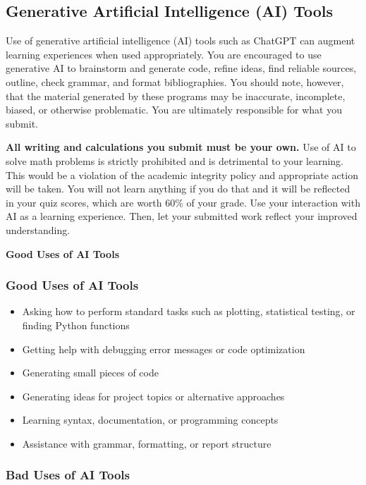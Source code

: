 \documentclass{article}
\begin{document}
\subsection{Generative Artificial Intelligence (AI) Tools}

Use of generative artificial intelligence (AI) tools such as ChatGPT can augment learning experiences when used appropriately. You are encouraged to use generative AI to brainstorm and generate code, refine ideas, find reliable sources, outline, check grammar, and format bibliographies. You should note, however, that the material generated by these programs may be inaccurate, incomplete, biased, or otherwise problematic. You are ultimately responsible for what you submit.

\textbf{All writing and calculations you submit must be your own.} Use of AI to solve math problems is strictly prohibited and is detrimental to your learning. This would be a violation of the academic integrity policy and appropriate action will be taken. You will not learn anything if you do that and it will be reflected in your quiz scores, which are worth 60\% of your grade. Use your interaction with AI as a learning experience. Then, let your submitted work reflect your improved understanding. 

\textbf{Good Uses of AI Tools}

\subsubsection{Good Uses of AI Tools}

\begin{itemize}[nosep]
    \item Asking how to perform standard tasks such as plotting, statistical testing, or finding Python functions
    \item Getting help with debugging error messages or code optimization
    \item Generating small pieces of code
    \item Generating ideas for project topics or alternative approaches
    \item Learning syntax, documentation, or programming concepts
    \item Assistance with grammar, formatting, or report structure
\end{itemize}

\subsubsection{Bad Uses of AI Tools}
\end{document}
